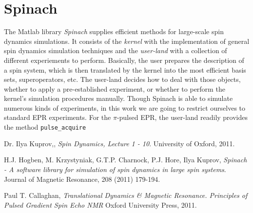\documentclass[11.5pt,a4paper]{article}
\begin{document}
\section{Spinach}
The Matlab library \emph{Spinach} supplies efficient methods for large-scale spin dynamics simulations. It consists of the \emph{kernel} with the implementation of general spin dynamics simulation techniques and the \emph{user-land} with a collection of different experiements to perform. Basically, the user prepares the description of a spin system, which is then translated by the kernel into the most efficient basis sets, superoperators, etc. The user-land decides how to deal with those objects, whether to apply a pre-established experiment, or whether to perform the kernel's simulation procedures manually. Though Spinach is able to simulate numerous kinds of experiments, in this work we are going to restrict ourselves to standard EPR experiments. For the $\pi$-pulsed EPR, the user-land readily provides the method \verb|pulse_acquire|



\FloatBarrier
\begin{thebibliography}{9}
  Dr. Ilya Kuprov,,
  \emph{Spin Dynamics, Lecture 1 - 10}.
  University of Oxford,
  2011.

  H.J. Hogben, M. Krzystyniak, G.T.P. Charnock, P.J. Hore, Ilya Kuprov,
  \emph{Spinach - A software library for simulation of spin dynamics in large spin systems}.
  Journal of Magnetic Resonance,
  208 (2011) 179-194.

  Paul T. Callaghan,
  \emph{Translational Dynamics & Magnetic Resonance. Principles of Pulsed Gradient Spin Echo NMR}
  Oxford University Press,
  2011.

\end{thebibliography}
\end{document}
